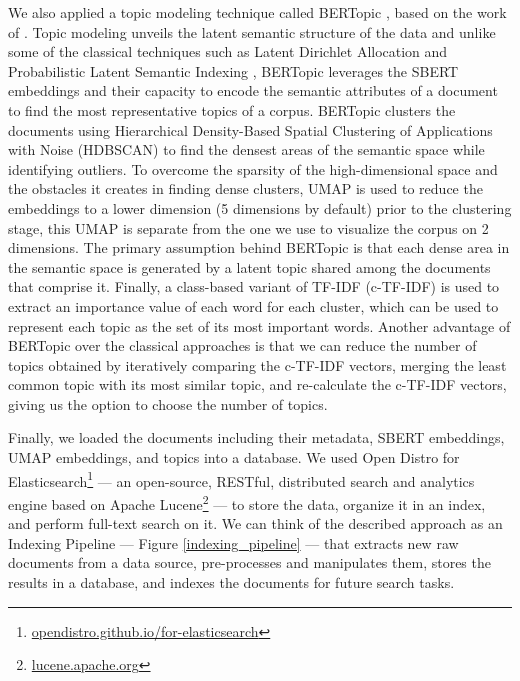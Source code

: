 \documentclass[a4paper]{article}
\begin{document}
We also applied a topic modeling technique called BERTopic \citep{grootendorst2020}, based on the work of \citet{angelov2020}. Topic modeling unveils the latent semantic structure of the data and unlike some of the classical techniques such as Latent Dirichlet Allocation \citep{blei2003} and Probabilistic Latent Semantic Indexing \citep{hofmann1999}, BERTopic leverages the SBERT embeddings and their capacity to encode the semantic attributes of a document to find the most representative topics of a corpus. BERTopic clusters the documents using Hierarchical Density-Based Spatial Clustering of Applications with Noise (HDBSCAN) \citep{mcinnes2017} to find the densest areas of the semantic space while identifying outliers. To overcome the sparsity of the high-dimensional space and the obstacles it creates in finding dense clusters, UMAP is used to reduce the embeddings to a lower dimension (5 dimensions by default) prior to the clustering stage, this UMAP is separate from the one we use to visualize the corpus on 2 dimensions. The primary assumption behind BERTopic is that each dense area in the semantic space is generated by a latent topic shared among the documents that comprise it. Finally, a class-based variant of TF-IDF \citep{jones1972} (c-TF-IDF) is used to extract an importance value of each word for each cluster, which can be used to represent each topic as the set of its most important words. Another advantage of BERTopic over the classical approaches is that we can reduce the number of topics obtained by iteratively comparing the c-TF-IDF vectors, merging the least common topic with its most similar topic, and re-calculate the c-TF-IDF vectors, giving us the option to choose the number of topics.

Finally, we loaded the documents including their metadata, SBERT embeddings, UMAP embeddings, and topics into a database. We used Open Distro for Elasticsearch\footnote{\href{https://opendistro.github.io/for-elasticsearch/}{opendistro.github.io/for-elasticsearch}} — an open-source, RESTful, distributed search and analytics engine based on Apache Lucene\footnote{\href{https://lucene.apache.org/}{lucene.apache.org}} — to store the data, organize it in an index, and perform full-text search on it. We can think of the described approach as an Indexing Pipeline — Figure \ref{indexing_pipeline} — that extracts new raw documents from a data source, pre-processes and manipulates them, stores the results in a database, and indexes the documents for future search tasks.
\end{document}

